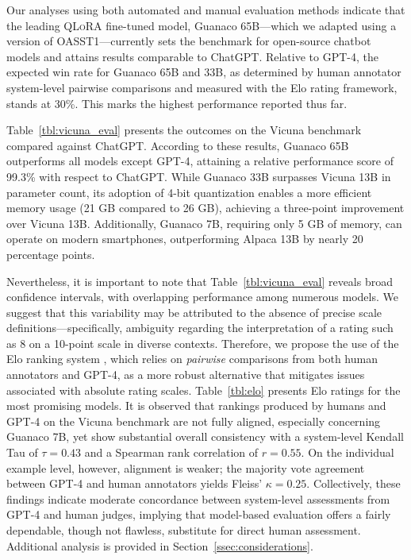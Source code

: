Our analyses using both automated and manual evaluation methods indicate that the leading \textsc{QLoRA} fine-tuned model, {Guanaco} 65B—which we adapted using a version of OASST1—currently sets the benchmark for open-source chatbot models and attains results comparable to ChatGPT. Relative to GPT-4, the expected win rate for {Guanaco} 65B and 33B, as determined by human annotator system-level pairwise comparisons and measured with the Elo rating framework, stands at 30\%. This marks the highest performance reported thus far.

Table~\ref{tbl:vicuna_eval} presents the outcomes on the Vicuna benchmark \cite{vicuna2023} compared against ChatGPT. According to these results, {Guanaco} 65B outperforms all models except GPT-4, attaining a relative performance score of 99.3\% with respect to ChatGPT. While {Guanaco} 33B surpasses Vicuna 13B in parameter count, its adoption of 4-bit quantization enables a more efficient memory usage (21 GB compared to 26 GB), achieving a three-point improvement over Vicuna 13B. Additionally, {Guanaco} 7B, requiring only 5 GB of memory, can operate on modern smartphones, outperforming Alpaca 13B by nearly 20 percentage points.

Nevertheless, it is important to note that Table~\ref{tbl:vicuna_eval} reveals broad confidence intervals, with overlapping performance among numerous models. We suggest that this variability may be attributed to the absence of precise scale definitions—specifically, ambiguity regarding the interpretation of a rating such as 8 on a 10-point scale in diverse contexts. Therefore, we propose the use of the Elo ranking system \citep{elo1967proposed}, which relies on \textit{pairwise} comparisons from both human annotators and GPT-4, as a more robust alternative that mitigates issues associated with absolute rating scales. Table~\ref{tbl:elo} presents Elo ratings for the most promising models. It is observed that rankings produced by humans and GPT-4 on the Vicuna benchmark are not fully aligned, especially concerning Guanaco 7B, yet show substantial overall consistency with a system-level Kendall Tau of $\tau=0.43$ and a Spearman rank correlation of $r=0.55$. On the individual example level, however, alignment is weaker; the majority vote agreement between GPT-4 and human annotators yields Fleiss’ $\kappa=0.25$. Collectively, these findings indicate moderate concordance between system-level assessments from GPT-4 and human judges, implying that model-based evaluation offers a fairly dependable, though not flawless, substitute for direct human assessment. Additional analysis is provided in Section~\ref{ssec:considerations}.

